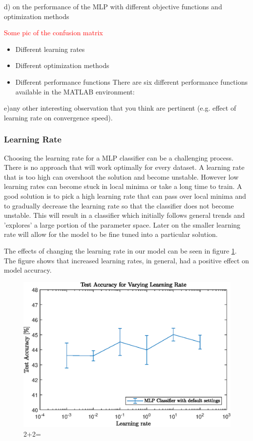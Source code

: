 d) on the performance of the MLP with different objective functions and optimization methods

\textcolor{red}{Some pic of the confusion matrix}

\begin{itemize}
   	\item Different learning rates

   	\item Different optimization methods

   	\item Different performance functions
   	There are six different performance functions available in the MATLAB environment:


\end{itemize}
e)any other interesting observation that you think are pertinent (e.g. effect of learning rate on convergence speed).

\subsubsection{Learning Rate}

Choosing the learning rate for a MLP classifier can be a challenging process. There is no approach that will work optimally for every dataset. A learning rate that is too high can overshoot the solution and become unstable. However low learning rates can become stuck in local minima or take a long time to train. A good solution is to pick a high learning rate that can pass over local minima and  to gradually decrease the learning rate so that the classifier does not become unstable. This will result in a classifier which initially follows general trends and 'explores' a large portion of the parameter space. Later on the smaller learning rate will allow for the model to be fine tuned into a particular solution.

The effects of changing the learning rate in our model can be seen in figure \ref{fig:learningRate}. The figure shows that increased learning rates, in general, had a positive effect on model accuracy.


\begin{figure}[h!]
    \centering
    \includegraphics{images/learningRate.eps}
    \caption{2+2=}
    \label{fig:learningRate}
 \end{figure}

